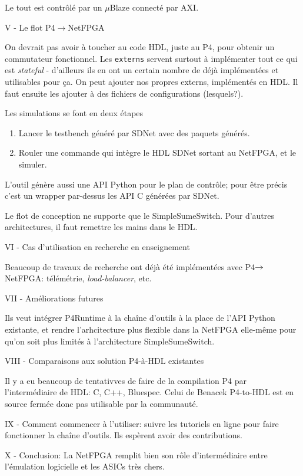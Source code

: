 Le tout est contrôlé par un $\mu$Blaze connecté par AXI.

V - Le flot P4$\rightarrow$NetFPGA

On devrait pas avoir à toucher au code HDL, juste au P4, pour obtenir un commutateur fonctionnel. Les \texttt{externs} servent surtout à implémenter tout ce qui est \emph{stateful} - d'ailleurs ils en ont un certain nombre de déjà implémentées et utilisables pour ça. On peut ajouter nos propres externs, implémentés en HDL. Il faut ensuite les ajouter à des fichiers de configurations (lesquels?).

Les simulations se font en deux étapes
\begin{enumerate}
	\item Lancer le testbench généré par SDNet avec des paquets générés.
	\item Rouler une commande qui intègre le HDL SDNet sortant au NetFPGA, et le simuler.
\end{enumerate}

L'outil génère aussi une API Python pour le plan de contrôle; pour être précis c'est un wrapper par-dessus les API C générées par SDNet.

Le flot de conception ne supporte que le SimpleSumeSwitch. Pour d'autres architectures, il faut remettre les mains dans le HDL.

VI - Cas d'utilisation en recherche en enseignement

Beaucoup de travaux de recherche ont déjà été implémentées avec P4$\rightarrow$NetFPGA: télémétrie, \emph{load-balancer}, etc.

VII - Améliorations futures

Ils veut intégrer P4Runtime à la chaîne d'outils à la place de l'API Python existante, et rendre l'arhcitecture plus flexible dans la NetFPGA elle-même pour qu'on soit plus limités à l'architecture SimpleSumeSwitch.

VIII - Comparaisons aux solution P4-à-HDL existantes

Il y a eu beaucoup de tentativves de faire de la compilation P4 par l'intermédiaire de HDL: C, C++, Bluespec. Celui de Benacek \og P4-to-HDL \fg est en source fermée donc pas utilisable par la communauté.

IX - Comment commencer à l'utiliser: suivre les tutoriels en ligne pour faire fonctionner la chaîne d'outils. Ils espèrent avoir des contributions.

X - Conclusion: La NetFPGA remplit bien son rôle d'intermédiaire entre l'émulation logicielle et les ASICs très chers.

